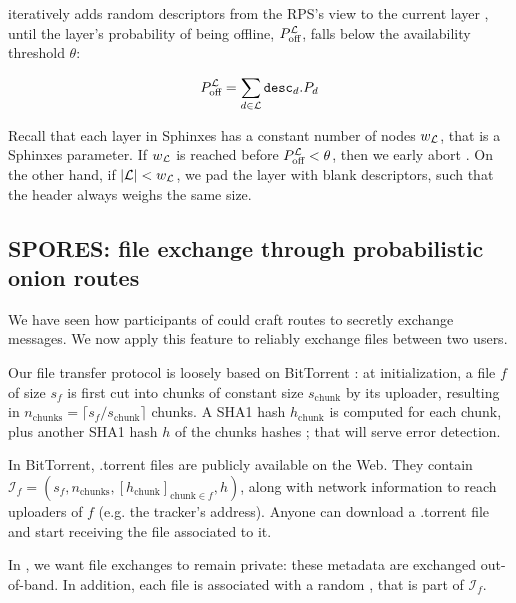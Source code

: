 \CreateLayer\xspace iteratively adds random descriptors from the RPS's view \rpsview to the current layer \layer, until the layer's probability of being offline, $P_{\text{off}}^{\mathcal{L}}$, falls below the availability threshold $\theta$:

$$ P_{\text{off}}^{\mathcal{L}} = \sum\limits_{d \in {\mathcal{L}}}{\mathtt{desc}}_d.P_d $$

Recall that each layer in Sphinxes has a constant number of nodes $w_{\mathcal{L}}$, that is a Sphinxes parameter.
If $w_{\mathcal{L}}$ is reached before $P_{\text{off}}^{\mathcal{L}} < \theta$, then we early abort \CreateLayer.
On the other hand, if $|{\mathcal{L}}| < w_{\mathcal{L}}$, we pad the layer with blank descriptors, such that the header always weighs the same size.


\subsection{SPORES: file exchange through probabilistic onion routes}
\label{ssec:spores_file_exchange_through_probabilistic_onion_routes}

\newcommand\finfo{\ensuremath{\mathcal{I}_f}}
\newcommand\filesize{\ensuremath{s_f}\xspace}
\newcommand\chunksize{\ensuremath{s_{\text{chunk}}}\xspace}
\newcommand\nchunks{\ensuremath{n_{\text{chunks}}}\xspace}
\newcommand\hashchunk{\ensuremath{h_{\text{chunk}}}\xspace}
\newcommand\hashfile{\ensuremath{h}\xspace}

We have seen how participants of \name could craft routes to secretly exchange messages.
We now apply this feature to reliably exchange files between two users.

Our file transfer protocol is loosely based on BitTorrent \cite{bt_bep3}: 
at initialization, a file $f$ of size \filesize is first cut into chunks of constant size \chunksize by its uploader,
resulting in $\nchunks = \lceil \filesize / \chunksize \rceil$ chunks.
A SHA1 hash \hashchunk is computed for each chunk, plus another SHA1 hash \hashfile of the chunks hashes ; that will serve error detection. 


In BitTorrent, .torrent files are publicly available on the Web.
They contain $\finfo = \left(\filesize, \nchunks, \left[\hashchunk\right]_{\text{chunk} \in f}, \hashfile\right)$, 
along with network information to reach uploaders of $f$ (e.g. the tracker's address).
Anyone can download a .torrent file and start receiving the file associated to it.

In \name, we want file exchanges to remain private: these metadata are exchanged out-of-band.
In addition, each file is associated with a random \fileid, that is part of \finfo.

